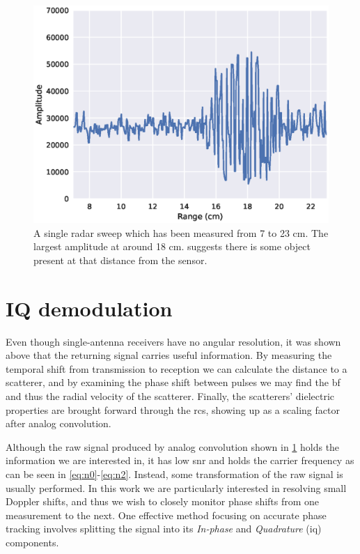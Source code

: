 \begin{figure}[h]
	\centering
	\includegraphics[scale=0.7]{figs_temp/single_sweep_raw}
	\caption{A single radar sweep which has been measured from 7 to 23 cm. The largest amplitude at around 18 cm. suggests there is some object present at that distance from the sensor.}
	\label{fig:single_sweep_raw}
\end{figure}

\section{IQ demodulation}
\label{IQ}

Even though single-antenna receivers have no angular resolution, it was shown above that the returning signal carries useful information. By measuring the temporal shift from transmission to reception we can calculate the distance to a scatterer, and by examining the phase shift between pulses we may find the \gls{bf} and thus the radial velocity of the scatterer. Finally, the scatterers' dielectric properties are brought forward through the \gls{rcs}, showing up as a scaling factor after analog convolution. 

Although the raw signal produced by analog convolution shown in \ref{fig:single_sweep_raw} holds the information we are interested in, it has low \gls{snr} \citep{richards_2014} and holds the carrier frequency as can be seen in \ref{eq:n0}-\ref{eq:n2}. Instead, some transformation of the raw signal is usually performed. In this work we are particularly interested in resolving small Doppler shifts, and thus we wish to closely monitor phase shifts from one measurement to the next. One effective method focusing on accurate phase tracking involves splitting the signal into its \emph{In-phase} and \emph{Quadrature} (\gls{iq}) components. 

